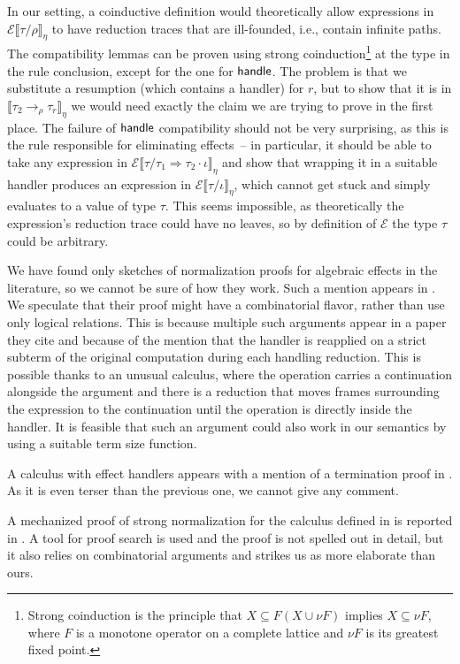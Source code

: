 \documentclass[a4paper, 11pt,titlepage, openright, twoside]{report}
\newcommand{\keyword}[1]{\textsf{\textup{#1}}}
\newcommand{\KwHandle}{\keyword{handle}}
\newcommand{\E}{\mathcal{E}}
\newcommand{\+}{\enspace}
\begin{document}
In our setting, a coinductive definition would theoretically allow
expressions in $\E⟦τ/ρ⟧_η$ to have reduction traces that are ill-founded,
i.e., contain infinite paths.
The compatibility lemmas can be proven using strong coinduction\footnote{
	Strong coinduction is the principle that $X ⊆ F(X ∪ νF)$ implies $X ⊆ νF$,
	where $F$ is a monotone operator on a complete lattice and $νF$ is its greatest fixed point.
}
	at the type in the rule conclusion,
except for the one for $\KwHandle$.
The problem is that we substitute a resumption
(which contains a handler) for $r$,
but to show that it is in $⟦τ_2 →_ρ τ_r⟧_η$
we would need exactly the claim we are trying to prove in the first place.
The failure of $\KwHandle$ compatibility should not be very surprising,
as this is the rule responsible for eliminating effects –
in particular, it should be able to take
any expression in $\E⟦τ/τ_1 \Rightarrow τ_2 · ι⟧_η$ and show that wrapping it in a
suitable handler produces an expression in $\E⟦τ/ι⟧_η$, which cannot get
stuck and simply evaluates to a value of type $τ$.
This seems impossible,
as theoretically the expression's reduction trace could have no
leaves, so by definition of $\E$ the type $τ$ could be arbitrary.

We have found only sketches of normalization proofs for algebraic effects in the literature,
so we cannot be sure of how they work.
Such a mention appears in \cite{hia}.
We speculate that their proof might have
a combinatorial flavor, rather than use only logical relations.
This is because multiple such arguments appear in a paper they cite \cite{exrw} and
because of the mention that the handler is reapplied
on a strict subterm of the original computation during each handling reduction.
This is possible thanks to an unusual calculus,
where the operation carries a continuation alongside the argument
and there is a reduction that moves frames surrounding the expression to the continuation until
the operation is directly inside the handler.
It is feasible that such an argument could also work in our semantics by using
a suitable term size function.

A calculus with effect handlers appears with a mention of a termination proof in \cite{expressive}.
As it is even terser than the previous one, we cannot give any comment.

A mechanized proof of strong normalization for the calculus defined in \cite{expressive}
is reported in \cite{sol}.
A tool for proof search is used and the proof is not spelled out in detail,
but it also relies on combinatorial arguments and strikes us as more elaborate than ours.
\end{document}

